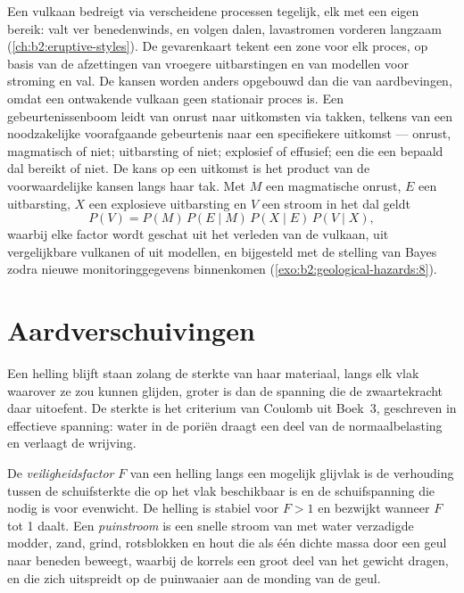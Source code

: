 Een vulkaan bedreigt via verscheidene processen tegelijk, elk met een eigen bereik:  valt ver
benedenwinds,  en  volgen dalen, lavastromen vorderen langzaam
(\cref{ch:b2:eruptive-styles}). De gevarenkaart tekent een zone voor elk proces, op basis van de afzettingen van vroegere
uitbarstingen en van modellen voor stroming en val. De kansen worden anders opgebouwd dan die van
aardbevingen, omdat een ontwakende vulkaan geen stationair proces is. Een gebeurtenissenboom leidt
van onrust naar uitkomsten via takken, telkens van een noodzakelijke voorafgaande gebeurtenis naar een specifiekere
uitkomst --- onrust, magmatisch of niet; uitbarsting of niet; explosief of effusief; een 
die een bepaald dal bereikt of niet. De kans op een uitkomst is het product van de voorwaardelijke
kansen langs haar tak. Met $M$ een magmatische onrust, $E$ een uitbarsting, $X$ een explosieve
uitbarsting en $V$ een stroom in het dal geldt
\begin{equation*}
P(V) = P(M) \, P(E \mid M) \, P(X \mid E) \, P(V \mid X),
\end{equation*}
waarbij elke factor wordt geschat uit het verleden van de vulkaan, uit vergelijkbare vulkanen of uit modellen, en bijgesteld met
de stelling van Bayes zodra nieuwe monitoringgegevens binnenkomen (\cref{exo:b2:geological-hazards:8}).

\section{Aardverschuivingen}\label{sec:b2:geological-hazards:landslides}

Een helling blijft staan zolang de sterkte van haar materiaal, langs elk vlak waarover ze zou kunnen glijden,
groter is dan de spanning die de zwaartekracht daar uitoefent. De sterkte is het criterium van Coulomb uit
Boek~3, geschreven in effectieve spanning: water in de poriën draagt een deel van de normaalbelasting en
verlaagt de wrijving.

\begin{definition}\label{def:b2:geological-hazards:slope}
De \emph{veiligheidsfactor} $F$ van een helling langs een mogelijk glijvlak
is de verhouding tussen de schuifsterkte die op het vlak beschikbaar is en de schuifspanning die nodig is voor
evenwicht. De helling is stabiel voor $F > 1$ en bezwijkt wanneer $F$ tot 1 daalt. Een
\emph{puinstroom} is een snelle stroom van met water verzadigde modder, zand, grind, rotsblokken en hout
die als één dichte massa door een geul naar beneden beweegt, waarbij de korrels een groot deel van het gewicht dragen, en die zich
uitspreidt op de puinwaaier aan de monding van de geul.
\end{definition}

